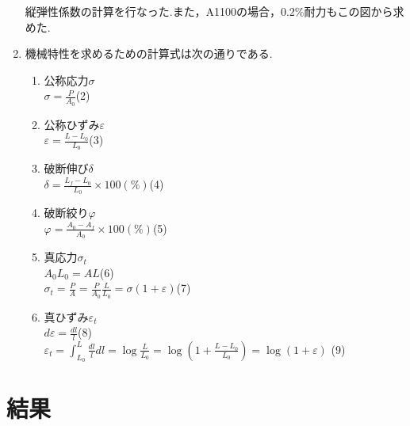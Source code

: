 \documentclass[10pt，a4j]{jsarticle}
\begin{document}
\begin{enumerate}
    縦弾性係数の計算を行なった.また，A1100の場合，0.2\%耐力もこの図から求めた.
    \item 機械特性を求めるための計算式は次の通りである.
      \begin{enumerate}
        \item 公称応力$σ$ \\
          $σ = \frac{P}{A_{0}}$\quad(2)
        \item 公称ひずみ$ε$ \\
          $ε = \frac{L-L_{0}}{L_{0}}$\quad(3)
        \item 破断伸び$δ$ \\
          $δ = \frac{L_{f} - L_{0}}{L_{0}} \times 100 (\%)$\quad(4)
        \item 破断絞り$φ$ \\
          $φ = \frac{A_{0} - A_{f}}{A_{0}} \times 100 (\%)$\quad(5)
        \item 真応力$σ_{t}$ \\
          $A_{0}L_{0} = AL$\quad(6) \\
          $σ_{t} = \frac{P}{A} = \frac{P}{A_{0}} \frac{L}{L_{0}} = σ(1+ε)$\quad(7) \\
        \item 真ひずみ$ε_{t}$ \\
          $dε = \frac{dl}{l}$\quad(8) \\
          $ε_{t} = \int_{L_{0}}^{L} \frac{dl}{l}dl = \log \frac{L}{L_{0}} = \log (1+\frac{L-L_{0}}{L_{0}}) = \log (1+ε)$ \quad(9)
      \end{enumerate}
  \end{enumerate}
\section{結果}
\end{document}
